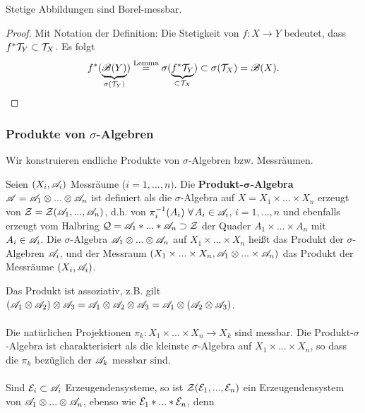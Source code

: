 \begin{lemma}
\begin{mdframed}
Stetige Abbildungen sind Borel-messbar.
\end{mdframed}
\begin{proof}
Mit Notation der Definition: Die Stetigkeit von $f:X \longrightarrow Y$ bedeutet, dass $f^* \TT_Y \subset \TT_X$. Es folgt
$$
f^*(\underbrace{\BB(Y)}_{\sigma(\TT_Y)}) \overset{\text{Lemma}}= \sigma(\underbrace{f^*\TT_Y}_{\subset \TT_X}) \subset \sigma(\TT_X) = \BB(X).
$$
\end{proof}
\end{lemma}

\subsubsection{Produkte von $\sigma$-Algebren}
Wir konstruieren endliche Produkte von $\sigma$-Algebren bzw. Messräumen. 
\begin{definition}
\begin{mdframed}
Seien $(X_i, \AA_i)$ Messräume ($i=1,...,n)$. Die \textbf{Produkt-$\boldsymbol\sigma$-Algebra} $\AA = \AA_1 \otimes ... \otimes \AA_n$ ist definiert als die $\sigma$-Algebra auf $X = X_1 \times ... \times X_n$ erzeugt von $\ZZ = \ZZ(\AA_1, ..., \AA_n)$, d.h. von $\pi_i^{-1}(A_i) \ \forall A_i \in \AA_i$, $i=1,...,n$ und ebenfalls erzeugt vom Halbring $\QQ = \AA_1 \ast ... \ast \AA_n \supset \ZZ$ der Quader $A_1 \times ... \times A_n$ mit $A_i \in \AA_i$.
Die $\sigma$-Algebra $\AA_1 \otimes ... \otimes \AA_n$ auf $X_1 \times ... \times X_n$ heißt das Produkt der $\sigma$-Algebren $\AA_i$, und der Messraum $(X_1\times ... \times X_n, \AA_1 \otimes ... \times \AA_n)$ das Produkt der Messräume $(X_i,\AA_i)$.
\end{mdframed}
\end{definition}
Das Produkt ist assoziativ, z.B. gilt $(\AA_1 \otimes \AA_2) \otimes \AA_3 = \AA_1 \otimes \AA_2 \otimes \AA_3 = \AA_1 \otimes (\AA_2 \otimes \AA_3)$.\Ueb \\\\
Die natürlichen Projektionen $\pi_k:X_1 \times ... \times X_n \longrightarrow X_k$ sind messbar. Die Produkt-$\sigma$-Algebra ist charakterisiert als die kleinste $\sigma$-Algebra auf $X_1 \times ... \times X_n$, so dass die $\pi_k$ bezüglich der $\AA_k$ messbar sind. \\\\
Sind $\EE_i \subset \AA_i$ Erzeugendensysteme, so ist $\ZZ(\EE_1,...,\EE_n)$ ein Erzeugendensystem von $\AA_1 \otimes ... \otimes \AA_n$, ebenso wie $\EE_1 \ast ... \ast \EE_n$, denn
